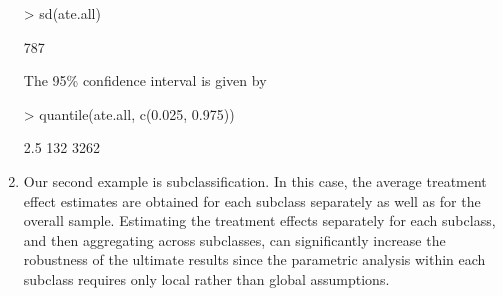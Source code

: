 \begin{enumerate}
\begin{Schunk}
\begin{Soutput}
\end{Soutput}
\begin{Sinput}
> sd(ate.all)
\end{Sinput}
\begin{Soutput}
[1] 787

\end{Soutput}
\end{Schunk}
The 95\% confidence interval is given by
\begin{Schunk}
\begin{Sinput}
> quantile(ate.all, c(0.025, 0.975))
\end{Sinput}
\begin{Soutput}
 2.5% 97.5% 
  132  3262 

\end{Soutput}
\end{Schunk}
  
\item Our second example is subclassification. In this case, the
  average treatment effect estimates are obtained for each subclass
  separately as well as for the overall sample.  Estimating the
  treatment effects separately for each subclass, and then aggregating
  across subclasses, can significantly increase the robustness of the
  ultimate results since the parametric analysis within each subclass
  requires only local rather than global assumptions.


\end{enumerate}
